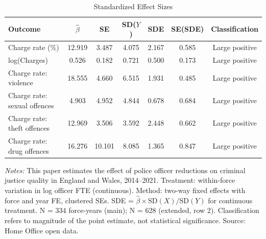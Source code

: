 \begin{table}[ht]
\centering
\caption{Standardized Effect Sizes}
\label{tab:sde}
\small
\begin{tabular}{lcccccc}
\hline\hline
Outcome & $\hat{\beta}$ & SE & SD($Y$) & SDE & SE(SDE) & Classification \\
\hline
Charge rate (\%) & 12.919 & 3.487 & 4.075 & 2.167 & 0.585 & Large positive \\
log(Charges) & 0.526 & 0.182 & 0.721 & 0.500 & 0.173 & Large positive \\
Charge rate: violence & 18.555 & 4.660 & 6.515 & 1.931 & 0.485 & Large positive \\
Charge rate: sexual offences & 4.903 & 4.952 & 4.844 & 0.678 & 0.684 & Large positive \\
Charge rate: theft offences & 12.969 & 3.506 & 3.592 & 2.448 & 0.662 & Large positive \\
Charge rate: drug offences & 16.276 & 10.101 & 8.085 & 1.365 & 0.847 & Large positive \\
\hline\hline
\end{tabular}
\begin{minipage}{0.95\textwidth}
\vspace{3pt}
\small\textit{Notes:} This paper estimates the effect of police officer reductions on criminal justice quality in England and Wales, 2014--2021. Treatment: within-force variation in log officer FTE (continuous). Method: two-way fixed effects with force and year FE, clustered SEs. SDE = $\hat{\beta} \times \text{SD}(X) / \text{SD}(Y)$ for continuous treatment. N = 334 force-years (main); N = 628 (extended, row 2). Classification refers to magnitude of the point estimate, not statistical significance. Source: Home Office open data.
\end{minipage}
\end{table}

